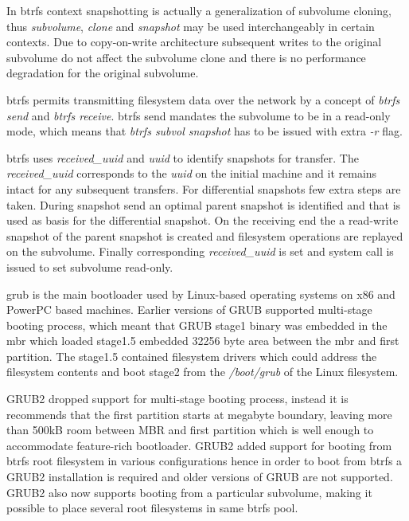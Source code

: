 \documentclass[a4paper,11pt]{kth-mag}
\begin{document}
In \acrshort{btrfs} context snapshotting is actually
a generalization of subvolume cloning,
thus \emph{subvolume}, \emph{clone} and \emph{snapshot} may be used
interchangeably in certain contexts.
Due to copy-on-write architecture subsequent writes
to the original subvolume do not affect
the subvolume clone and there is no performance
degradation for the original subvolume.

\acrshort{btrfs} permits transmitting filesystem data over the network
by a concept of \emph{btrfs send} and \emph{btrfs receive}.
\acrshort{btrfs} send mandates the subvolume to be in a read-only mode,
which means that \emph{btrfs subvol snapshot} has to be issued
with extra \emph{-r} flag.


\acrshort{btrfs} uses \emph{received\_uuid} and \emph{uuid} to
identify snapshots for transfer.
The \emph{received\_uuid} corresponds to the \emph{uuid} on
the initial machine and it remains intact for any subsequent transfers.
For differential snapshots few extra steps are taken.
During snapshot send an optimal parent snapshot is
identified and that is used as basis for the differential snapshot.
On the receiving end the a read-write snapshot of the parent
snapshot is created and filesystem operations
are replayed on the subvolume.
Finally corresponding \emph{received\_uuid} is set and
system call is issued to set subvolume read-only.


\acrfull{grub}
is the main bootloader used
by Linux-based operating systems on x86 and PowerPC based machines.
Earlier versions of GRUB supported multi-stage booting process,
which meant that GRUB stage1 binary was embedded in the
\acrfull{mbr} which loaded stage1.5 embedded
32256 byte area between the \acrshort{mbr} and first partition.
The stage1.5 contained filesystem drivers which could
address the filesystem contents and boot stage2 from
the \emph{/boot/grub} of the Linux filesystem.
\cite{grub2-fails-to-install}

GRUB2 dropped support for multi-stage booting process,
instead it is recommends that the first partition
starts at megabyte boundary, leaving
more than 500kB room between MBR
and first partition which is well enough to accommodate
feature-rich bootloader.
GRUB2 added support for booting from \acrshort{btrfs} root filesystem
in various configurations
hence in order to boot from
\acrshort{btrfs} a GRUB2 installation is required and older versions of
GRUB are not supported.
GRUB2 also now supports booting from a particular subvolume,
making it possible to place several root filesystems
in same \acrshort{btrfs} pool.
\cite{does-grub-support-btrfs}
\end{document}
